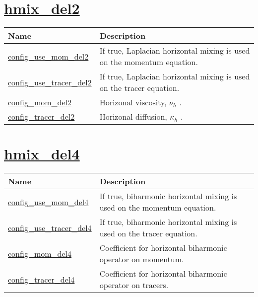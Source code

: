 \section[hmix\_del2]{\hyperref[sec:nm_sec_hmix_del2]{hmix\_del2}}
\label{sec:nm_tab_hmix_del2}

{\small
\begin{center}
\begin{longtable}{| p{2.0in} || p{4.0in} |}
	\hline
	{\bf Name} & {\bf Description} \\
	\hline
	\hline
	\hyperref[subsec:nm_sec_config_use_mom_del2]{config\_use\_mom\_del2} & If true, Laplacian horizontal mixing is used on the momentum equation. \\
	\hline
	\hyperref[subsec:nm_sec_config_use_tracer_del2]{config\_use\_tracer\_del2} & If true, Laplacian horizontal mixing is used on the tracer equation. \\
	\hline
	\hyperref[subsec:nm_sec_config_mom_del2]{config\_mom\_del2} &  Horizonal viscosity,  $\nu_h$ . \\
	\hline
	\hyperref[subsec:nm_sec_config_tracer_del2]{config\_tracer\_del2} &  Horizonal diffusion,  $\kappa_h$ . \\
	\hline
\end{longtable}
\end{center}
}
\section[hmix\_del4]{\hyperref[sec:nm_sec_hmix_del4]{hmix\_del4}}
\label{sec:nm_tab_hmix_del4}

{\small
\begin{center}
\begin{longtable}{| p{2.0in} || p{4.0in} |}
	\hline
	{\bf Name} & {\bf Description} \\
	\hline
	\hline
	\hyperref[subsec:nm_sec_config_use_mom_del4]{config\_use\_mom\_del4} & If true, biharmonic horizontal mixing is used on the momentum equation. \\
	\hline
	\hyperref[subsec:nm_sec_config_use_tracer_del4]{config\_use\_tracer\_del4} & If true, biharmonic horizontal mixing is used on the tracer equation. \\
	\hline
	\hyperref[subsec:nm_sec_config_mom_del4]{config\_mom\_del4} & Coefficient for horizontal biharmonic operator on momentum. \\
	\hline
	\hyperref[subsec:nm_sec_config_tracer_del4]{config\_tracer\_del4} & Coefficient for horizontal biharmonic operator on tracers. \\
	\hline
\end{longtable}
\end{center}
}
